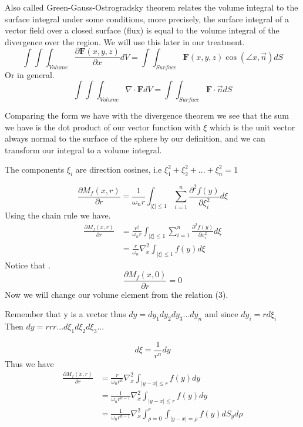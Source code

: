 \begin{theorem}
    Also called Green-Gauss-Ostrogradsky theorem relates the volume integral to the surface integral under some conditions, more precisely, the surface integral of a vector field over a closed surface (flux) is equal to the volume integral of the divergence over the region. We will use this later in our treatment.
    \[
        \int\int\int_{Volume} \frac{\partial \textbf{F}(x,y,z)}{\partial x}dV = \int\int_{Surface} \textbf{F}(x,y,z)\cos(\angle x,\vec{n}) dS    
    \]
    Or in general.
    \[
        \int\int\int_{Volume} \nabla \cdot \textbf{F} dV = \int\int_{Surface} \textbf{F}\cdot \vec{n} dS
    \]
\end{theorem}

Comparing the form we have with the divergence theorem we see that the sum we have is the dot product of our vector function with $\xi$
which is the unit vector always normal to the surface of the sphere by our definition, and we can transform our integral to a volume integral.
\begin{enrichment*}{}
    The components $\xi_i$ are direction cosines, i.e $\xi_{1}^{2}+\xi_{2}^{2}+...+\xi_{n}^{2} = 1$
\end{enrichment*}
\[
    \frac{\partial M_f (x,r)}{\partial r} = \frac{1}{\omega_n r} \int_{|\xi|\leq 1} \sum_{i=1}^{n} \frac{\partial^2 f(y)}{\partial \xi_{i}^{2}} d\xi    
\]
Using the chain rule we have.
\begin{align*}
\frac{\partial M_f (x,r)}{\partial r} &= \frac{r^2}{\omega_n r} \int_{|\xi|\leq 1} \sum_{i=1}^{n} \frac{\partial^2 f(y)}{\partial x_{i}^{2}} d\xi
\\
&=\frac{r}{\omega_n} \nabla_{x}^{2} \int_{|\xi|\leq 1} f(y)d\xi
\end{align*}
Notice that .
\[
    \frac{\partial M_f (x,0)}{\partial r} = 0    
\]
Now we will change our volume element from the relation (3).
\begin{enrichment*}{}
    Remember that y is a vector thus $dy = dy_1 dy_2 dy_3 ...dy_n$ and since $dy_i = rd\xi_i$ 
    \\
    Then $dy = rrr...d\xi_1 d\xi_2 d\xi_3 ...$
\end{enrichment*}
\[
    d\xi = \frac{1}{r^n}dy    
\]
Thus we have 
\begin{align*}
\frac{\partial M_f (x,r)}{\partial r} &= \frac{r}{\omega_n r^n} \nabla_{x}^{2} \int_{|y-x|\leq r} f(y)dy
\\
&= \frac{1}{\omega_n r^{n-1}} \nabla_{x}^{2} \int_{|y-x|\leq r} f(y)dy
\\
&= \frac{1}{\omega_n r^{n-1}} \nabla_{x}^{2} \int_{\rho = 0}^{r} \int_{|y-x| = \rho} f(y)dS_y d\rho
\end{align*}
